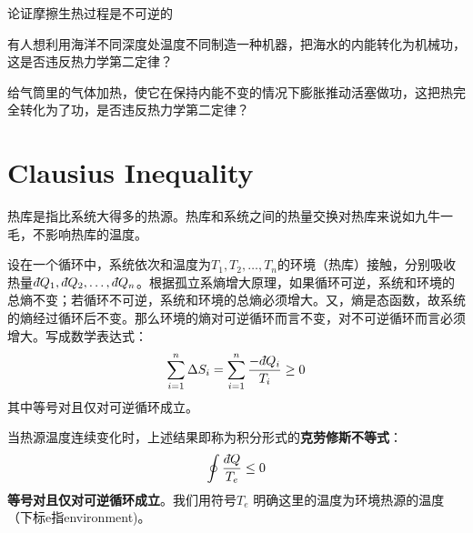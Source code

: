 \documentclass[CJK]{beamer}
\begin{document}
\begin{frame}
\bchL


\bitem
\item{论证摩擦生热过程是不可逆的}
\eitem

\echL
\end{frame}

\begin{frame}
\bchL


\bitem
\item{有人想利用海洋不同深度处温度不同制造一种机器，把海水的内能转化为机械功，这是否违反热力学第二定律？}
\eitem

\echL
\end{frame}


\begin{frame}
\bchL


\bitem
\item{给气筒里的气体加热，使它在保持内能不变的情况下膨胀推动活塞做功，这把热完全转化为了功，是否违反热力学第二定律？}
\eitem
\echL
\end{frame}

\section{Clausius Inequality}




\begin{frame}
\bch
热库是指比系统大得多的热源。热库和系统之间的热量交换对热库来说如九牛一毛，不影响热库的温度。

\ech
\end{frame}


\begin{frame}
\bch
{\small
设在一个循环中，系统依次和温度为$T_1, T_2, \ldots, T_n$的环境（热库）接触，分别吸收热量$\dbar Q_1, \dbar Q_2, \ldots, \dbar Q_n$。根据孤立系熵增大原理，如果循环可逆，系统和环境的总熵不变；若循环不可逆，系统和环境的总熵必须增大。又，熵是态函数，故系统的熵经过循环后不变。那么环境的熵对可逆循环而言不变，对不可逆循环而言必须增大。写成数学表达式：
$$\sum_{i=1}^n \Delta S_i = \sum_{i=1}^n \frac{-\dbar Q_i}{T_i} \ge 0$$
其中等号对且仅对可逆循环成立。

当热源温度连续变化时，上述结果即称为积分形式的{\bf 克劳修斯不等式}：
{\blue $$\oint \frac{\dbar Q}{T_e} \le 0 $$}
{\bf 等号对且仅对可逆循环成立}。我们用符号$T_e$ 明确这里的温度为环境热源的温度（下标e指environment)。
}
\ech
\end{frame}
\end{document}
